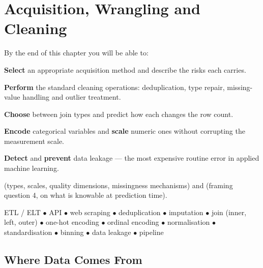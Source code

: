 \chapter{Acquisition, Wrangling and Cleaning}\label{ch:wrangling}

\begin{outcomes}
By the end of this chapter you will be able to:
\begin{tight}
  \item \textbf{Select} an appropriate acquisition method and describe the risks each carries.
  \item \textbf{Perform} the standard cleaning operations: deduplication, type repair, missing-value handling and outlier treatment.
  \item \textbf{Choose} between join types and predict how each changes the row count.
  \item \textbf{Encode} categorical variables and \textbf{scale} numeric ones without corrupting the measurement scale.
  \item \textbf{Detect} and \textbf{prevent} data leakage --- the most expensive routine error in applied machine learning.
\end{tight}
\end{outcomes}

\begin{prereq}
 (types, scales, quality dimensions, missingness mechanisms) and
 (framing question 4, on what is knowable at prediction time).
\end{prereq}

\begin{keyterms}
ETL / ELT $\bullet$ API $\bullet$ web scraping $\bullet$ deduplication $\bullet$
imputation $\bullet$ join (inner, left, outer) $\bullet$ one-hot encoding $\bullet$
ordinal encoding $\bullet$ normalisation $\bullet$ standardisation $\bullet$
binning $\bullet$ data leakage $\bullet$ pipeline
\end{keyterms}

\section{Where Data Comes From}

